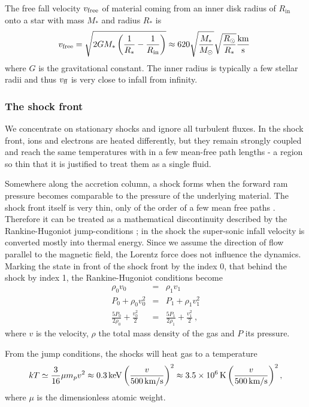 The free fall velocity $v_{\textnormal{free}}$ of material coming from an inner disk radius of $R_\mathrm{in}$ onto a star with mass $M_*$ and radius $R_*$ is
\begin{equation}
v_{\textnormal{free}} = \sqrt{{2GM_*} \left(\frac{1}{R_*} - \frac{1}{R_\mathrm{in}}\right)} \approx 620 \sqrt{\frac{M_*}{M_\odot}}\sqrt{\frac{R_\odot}{R_*}} \frac{\textnormal{km}}{\textnormal{s}}\ \label{eqn:freefall}
\end{equation}
where $G$ is the gravitational constant. The inner radius is typically a few stellar radii and thus $v_\textnormal{ff}$ is very close to infall from infinity.


\subsubsection{The shock front}
We concentrate on stationary shocks and ignore all turbulent fluxes. In the shock front, ions and electrons are heated differently, but they remain strongly coupled and reach the same temperatures with in a few mean-free path lengths - a region so thin that it is justified to treat them as a single fluid.

Somewhere along the accretion column, a shock forms when the forward ram pressure becomes comparable to the pressure of the underlying material. The shock front itself is very thin, only of the order of a few mean free paths \cite{raizerzeldovich}. Therefore it can be treated as a mathematical discontinuity described by the Rankine-Hugoniot jump-conditions \cite[][chap.~7, \S~15]{raizerzeldovich}; in the shock the super-sonic infall velocity is converted mostly into thermal energy. Since we assume the direction of flow parallel to the magnetic field, the Lorentz force does not influence the dynamics. Marking the state in front of the shock front by the index 0, that behind the shock by index 1, the Rankine-Hugoniot conditions become
\begin{eqnarray}
\rho_0 v_0 &=& \rho_1 v_1 \label{RH1}\\
P_0+\rho_0 v_0^2 &=& P_1+\rho_1 v_1^2 \label{RH2}\\
\frac{5 P_0}{2\rho_0}+\frac{v_0^2}{2}&=&\frac{5 P_1}{2\rho_1}+\frac{v_1^2}{2} \ ,\label{RH3}
\end{eqnarray}
where $v$ is the velocity, $\rho$ the total mass density of the gas and $P$ its pressure.

From the jump conditions, the shocks will heat gas to a temperature
\begin{equation}
kT \simeq \frac{3}{16}\mu m_p v^{2} \approx 0.3\,{\rm keV}\left(\frac{v}{500\,{\rm km/s}}\right)^{2} \approx3.5\times10^6\,{\rm K} \left(\frac{v}{500\,{\rm km/s}}\right)^{2},
\label{eqn:Tshock}
\end{equation}
where $\mu$ is the dimensionless atomic weight.

